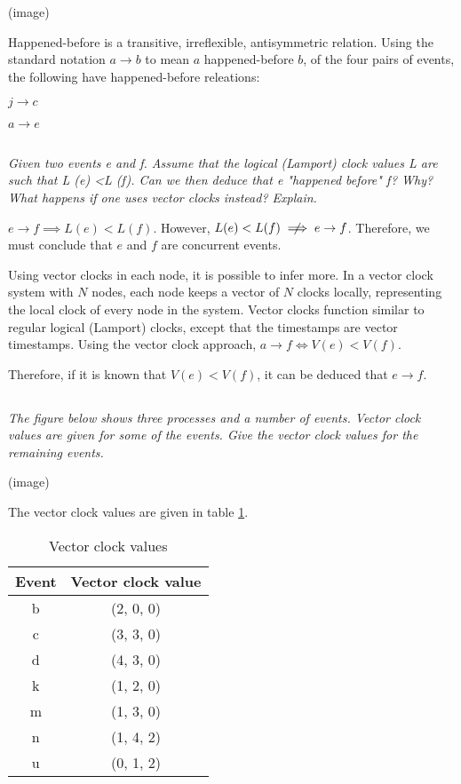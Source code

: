 \documentclass{article}
\newcommand{\question}[1]{\subsection{}\textit{#1}\bigskip}
\begin{document}
(image)

Happened-before is a transitive, irreflexible, antisymmetric relation.
Using the standard notation $ a \rightarrow b $ to mean $ a $ happened-before $ b$, of the four pairs of events, the following have happened-before releations:

\begin{itemize}
\begin{centering}
    \item{$ j \rightarrow c $}
    \item{$ a \rightarrow e $}
    \\
\end{centering}
\end{itemize}

\question{Given two events e and f. Assume that the logical (Lamport) clock values L are such that L (e) <L (f). Can we then deduce that e "happened before" f? Why? What happens if one uses vector clocks instead? Explain.}

$ e \rightarrow f \implies L(e) < L(f) $. However, $ L(e) < L(f) \centernot\implies e \rightarrow f $.
Therefore, we must conclude that $ e $ and $ f $ are concurrent events.

Using vector clocks in each node, it is possible to infer more.
In a vector clock system with $ N $ nodes, each node keeps a vector of $ N $ clocks locally, representing the local clock of every node in the system.
Vector clocks function similar to regular logical (Lamport) clocks, except that the timestamps are vector timestamps.
Using the vector clock approach, $ a \rightarrow f \iff V(e) < V(f) $.

Therefore, if it is known that $ V(e) < V(f) $, it can be deduced that $ e \rightarrow f $.

\question{The figure below shows three processes and a number of events. Vector clock values are given for some of the events. Give the vector clock values for the remaining events.}

(image)

The vector clock values are given in table \ref{table:vector-clock-values}.

\begin{table}
    \centering
    \begin{tabular}{c | c}
        Event & Vector clock value \\
        \hline
        b & (2, 0, 0) \\
        c & (3, 3, 0) \\
        d & (4, 3, 0) \\
        k & (1, 2, 0) \\
        m & (1, 3, 0) \\
        n & (1, 4, 2) \\
        u & (0, 1, 2) \\
    \end{tabular}
    \caption{Vector clock values}
    \label{table:vector-clock-values}
\end{table}
\end{document}
